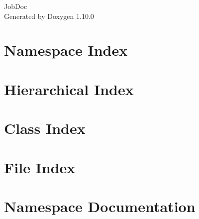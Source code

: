 \documentclass[twoside]{book}
\newcommand{\+}{\discretionary{\mbox{\scriptsize$\hookleftarrow$}}{}{}}
\newcommand{\clearemptydoublepage}{%
    \newpage{\pagestyle{empty}\cleardoublepage}%
  }
\begin{document}
  \raggedbottom
    \hypersetup{pageanchor=false,
                bookmarksnumbered=true,
                pdfencoding=unicode
               }
  \begin{titlepage}
  \vspace*{7cm}
  \begin{center}%
  {\Large Job\+Doc}\\
  \vspace*{1cm}
  {\large Generated by Doxygen 1.10.0}\\
  \end{center}
  \end{titlepage}
  \clearemptydoublepage
  \tableofcontents
  \clearemptydoublepage
  \hypersetup{pageanchor=true}


\chapter{Namespace Index}

\chapter{Hierarchical Index}

\chapter{Class Index}

\chapter{File Index}

\chapter{Namespace Documentation}

\end{document}

